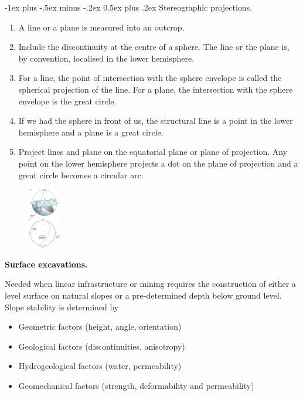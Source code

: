 \documentclass[10pt,landscape,a4paper]{article}
\makeatletter
\newcounter{Chapcounter}
\newcommand{\chapter}[1]{{\addtocounter{Chapcounter}{1}\fontsize{17}{16}\textbf{#1}}}
\renewcommand{\section}{\@startsection{section}{1}{0mm}%
	{-1ex plus -.5ex minus -.2ex}%
	{0.5ex plus .2ex}%
	{\normalfont\large\bfseries}}
\makeatother
\begin{document}
\begin{multicols}{3}
		\section{Stereographic projections.}
		\begin{enumerate}
			\item A line or a plane is measured into an outcrop.
			\item Include the discontinuity at the centre of a sphere. The line or the plane is, by convention, localised in the lower hemisphere.
			\item For a line, the point of intersection with the sphere envelope is called the spherical projection of the line. For a plane, the intersection with the sphere envelope is the great circle.
			\item If we had the sphere in front of us, the structural line is a point in the lower hemisphere and a plane is a great circle.
			\item Project lines and plane on the equatorial plane or plane of projection. Any point on the lower hemisphere projects a dot on the plane of projection and a great circle becomes a circular arc.
		\end{enumerate}
		\begin{figure}[H]
			\centering
			\includegraphics[width=0.13\textwidth]{stereographic}
		\end{figure}
		
		\chapter{Surface excavations.}
		
		Needed when linear infrastructure or mining requires the construction of either a level surface on natural slopes or a pre-determined depth below ground level.
		Slope stability is determined by
		\begin{itemize}
			\item Geometric factors (height, angle, orientation)
			\item Geological factors (discontinuities, anisotropy)
			\item Hydrogeological factors (water, permeability)
			\item Geomechanical factors (strength, deformability and permeability)
		\end{itemize}
		

\end{multicols}
\end{document}
